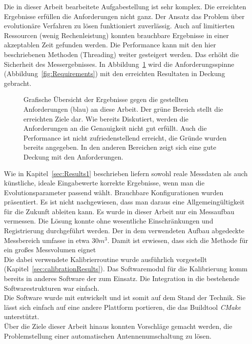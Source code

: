 %
Die in dieser Arbeit bearbeitete Aufgabestellung ist sehr komplex. Die erreichten Ergebnisse erfüllen die Anforderungen nicht ganz. Der Ansatz das Problem über evolutionäre Verfahren zu lösen funktioniert zuverlässig. Auch auf limitierten Ressourcen (wenig Rechenleistung) konnten brauchbare Ergebnisse in einer akzeptablen Zeit gefunden werden. Die Performance kann mit den hier beschriebenen Methoden (Threading) weiter gesteigert werden. Das erhöht die Sicherheit des Messergebnisses. In Abbildung~\ref{fig:Requirements_reached} wird die Anforderungsspinne (Abbildung~\ref{fig:Requirements}) mit den erreichten Resultaten in Deckung gebracht.\\
%
\begin{figure}[ht]
         \centering
         \caption[Anforderungsspinne]{ Grafische Übersicht der Ergebnisse gegen die gestellten Anforderungen (blau) an diese Arbeit. Der grüne Bereich stellt die erreichten Ziele dar. Wie bereits Diskutiert, werden die Anforderungen an die Genauigkeit nicht gut erfüllt. Auch die Performance ist nicht zufriedenstellend erreicht, die Gründe wurden bereits angegeben. In den anderen Bereichen zeigt sich eine gute Deckung mit den Anforderungen. }
         \vspace{2mm}
         \label{fig:Requirements_reached}
         
         \vspace{5mm}
\end{figure}
%

Wie in Kapitel~\ref{sec:Results1} beschrieben liefern sowohl reale Messdaten als auch künstliche, ideale Eingabewerte korrekte Ergebnisse, wenn man die Evolutionsparameter passend wählt. Brauchbare Konfigurationen wurden präsentiert. Es ist nicht nachgewiesen, dass man daraus eine Allgemeingültigkeit für die Zukunft ableiten kann. Es wurde in dieser Arbeit nur ein Messaufbau vermessen. Die Lösung konnte ohne wesentliche Einschränkungen und Registrierung durchgeführt werden. Der in dem verwendeten Aufbau abgedeckte Messbereich umfasse in etwa $30 m^3$. Damit ist erwiesen, dass sich die Methode für ein großes Messvolumen eignet\\
%

Die dabei verwendete Kalibrierroutine wurde ausführlich vorgestellt (Kapitel~\ref{sec:calibrationResults}). Das Softwaremodul für die Kalibrierung komm bereits in anderes Software der \amedogmbh zum Einsatz. Die Integration in die bestehende Softwarestrukturen war einfach. \\
%

Die Software wurde mit  entwickelt und ist somit auf dem Stand der Technik. Sie lässt sich einfach auf eine andere Plattform portieren, die das Buildtool \textit{CMake} unterstützt. \\

%
Über die Ziele dieser Arbeit hinaus konnten Vorschläge gemacht werden, die Problemstellung einer automatischen Antennenumschaltung zu lösen. 